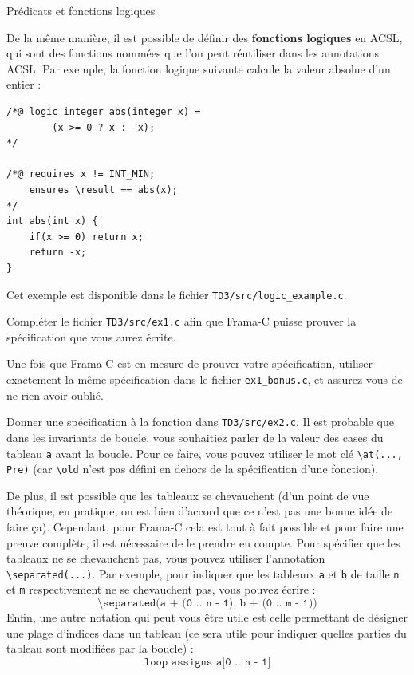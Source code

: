 \documentclass{article}
\begin{document}
\begin{Memo}{Prédicats et fonctions logiques}{}
    \medskip

    De la même manière, il est possible de définir des \textbf{fonctions logiques}
    en ACSL, qui sont des fonctions nommées que l'on peut réutiliser
    dans les annotations ACSL.
    Par exemple, la fonction logique suivante calcule la valeur absolue
    d'un entier :
    \begin{MeCode}
        \begin{lstlisting}[style=CStyle]
/*@ logic integer abs(integer x) =
        (x >= 0 ? x : -x);
*/

/*@ requires x != INT_MIN;
    ensures \result == abs(x);
*/
int abs(int x) {
    if(x >= 0) return x;
    return -x;
}
        \end{lstlisting}
    \end{MeCode}

    Cet exemple est disponible dans le fichier \texttt{TD3/src/logic\_example.c}.
\end{Memo}

\begin{Exercice}{}{}
    Compléter le fichier \texttt{TD3/src/ex1.c} afin que Frama-C puisse prouver
    la spécification que vous aurez écrite.

    \medskip

    Une fois que Frama-C est en mesure de prouver votre spécification, 
    utiliser exactement la même spécification dans le fichier \texttt{ex1\_bonus.c},
    et assurez-vous de ne rien avoir oublié.
\end{Exercice}

\begin{Exercice}{}{}
    Donner une spécification à la fonction dans \texttt{TD3/src/ex2.c}.
    Il est probable que dans les invariants de boucle, vous souhaitiez
    parler de la valeur des cases du tableau \texttt{a} avant la boucle.
    Pour ce faire, vous pouvez utiliser le mot clé
    \texttt{\textbackslash at(..., Pre)} (car \texttt{\textbackslash old} 
    n'est pas défini en dehors de la spécification d'une fonction).

    \medskip

    De plus, il est possible que les tableaux se chevauchent (d'un point de vue 
    théorique, en pratique, on est bien d'accord que ce n'est pas une bonne idée de faire ça).
    Cependant, pour Frama-C cela est tout à fait possible et pour faire une preuve complète,
    il est nécessaire de le prendre en compte.
    Pour spécifier que les tableaux ne se chevauchent pas, vous pouvez utiliser
    l'annotation \texttt{\textbackslash separated(...)}.
    Par exemple, pour indiquer que les tableaux \texttt{a} et \texttt{b}
    de taille \texttt{n} et \texttt{m} respectivement
    ne se chevauchent pas, vous pouvez écrire :
    \[
        \texttt{\textbackslash separated(a + (0 .. n - 1), b + (0 .. m - 1))}
    \]
    Enfin, une autre notation qui peut vous être utile est celle permettant de
    désigner une plage d'indices dans un tableau (ce sera utile pour indiquer
    quelles parties du tableau sont modifiées par la boucle) :
    \[
        \texttt{loop assigns a[0 .. n - 1]}
    \]
\end{Exercice}
\end{document}
